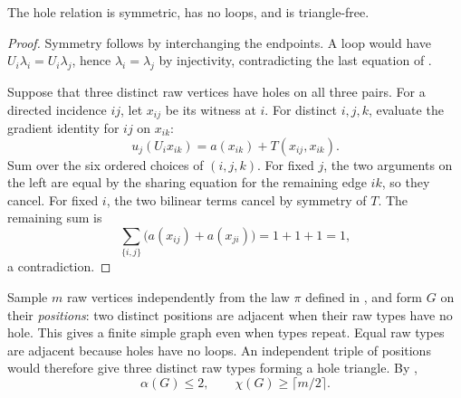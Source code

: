 \begin{lemma}\label{lem:hole-triangle-free}
The hole relation is symmetric, has no loops, and is triangle-free.
\end{lemma}
\begin{proof}
Symmetry follows by interchanging the endpoints.
A loop would have \(U_i\lambda_i=U_i\lambda_j\), hence \(\lambda_i=\lambda_j\) by injectivity, contradicting the last equation of .

Suppose that three distinct raw vertices have holes on all three pairs.
For a directed incidence \(ij\), let \(x_{ij}\) be its witness at \(i\).
For distinct \(i,j,k\), evaluate the gradient identity for \(ij\) on \(x_{ik}\):
\[
 u_j(U_ix_{ik})=a(x_{ik})+T(x_{ij},x_{ik}).
\]
Sum over the six ordered choices of \((i,j,k)\).
For fixed \(j\), the two arguments on the left are equal by the sharing equation for the remaining edge \(ik\), so they cancel.
For fixed \(i\), the two bilinear terms cancel by symmetry of \(T\).
The remaining sum is
\[
 \sum_{\{i,j\}}\bigl(a(x_{ij})+a(x_{ji})\bigr)=1+1+1=1,
\]
a contradiction.
\end{proof}

Sample \(m\) raw vertices independently from the law \(\pi\) defined in
, and form \(G\) on their \emph{positions}: two distinct positions are adjacent when their raw types have no hole.
This gives a finite simple graph even when types repeat.
Equal raw types are adjacent because holes have no loops.
An independent triple of positions would therefore give three distinct raw types forming a hole triangle.
By ,
\begin{equation}\label{eq:sample-independence}
 \alpha(G)\le2,\qquad \chi(G)\ge\lceil m/2\rceil.
\end{equation}
